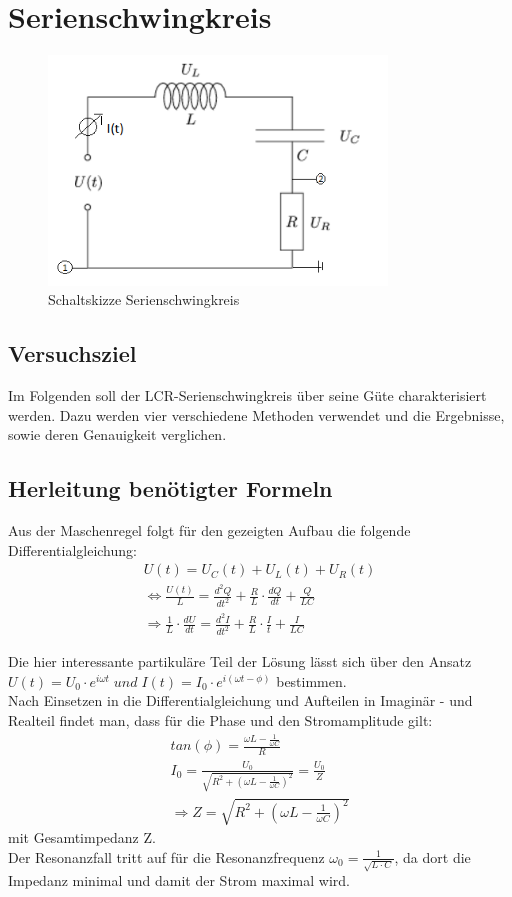 \documentclass[a4paper, 11pt]{article}
\begin{document}
\newpage 
\section{Serienschwingkreis}

\begin{figure}[H]
	\centering
	\includegraphics[trim = 0mm 0mm 0mm 0mm,clip, width=9cm]{Bilder/k.png}%
	\caption[Schaltskizze Serienschwingkreis]{Schaltskizze Serienschwingkreis}%
	\label{pic:Abbildung 1}%
\end{figure}
\subsection{Versuchsziel}
Im Folgenden soll der LCR-Serienschwingkreis über seine Güte charakterisiert werden. Dazu werden vier verschiedene Methoden verwendet und die Ergebnisse, sowie deren Genauigkeit verglichen.

\subsection{Herleitung benötigter Formeln}
Aus der Maschenregel folgt für den gezeigten Aufbau die folgende Differentialgleichung:
\begin{eqnarray}
U(t) = U_C(t) + U_L(t) + U_R(t) \\
\Leftrightarrow \frac{U(t)}{L} = \frac{d^2Q}{dt^2} + \frac{R}{L} \cdot \frac{dQ}{dt} + \frac{Q}{L C} \\
\Rightarrow	\frac{1}{L} \cdot \frac{dU}{dt} = \frac{d^2I}{dt^2} + \frac{R}{L} \cdot\frac{I}{t} + \frac{I}{LC}
\end{eqnarray}

Die hier interessante partikuläre Teil der Lösung lässt sich über den Ansatz $U(t) = U_0 \cdot e^{i \omega t} \; und \; I(t) = I_0 \cdot e^{i( \omega t - \phi)}$ bestimmen.\\
Nach Einsetzen in die Differentialgleichung und Aufteilen in Imaginär - und Realteil findet man, dass für die Phase und den Stromamplitude gilt:
\begin{eqnarray}
tan(\phi) = \frac{\omega L - \frac{1}{\omega C}}{R} \\
I_0 = \frac{U_0}{\sqrt{R^2 + (\omega L - \frac{1}{\omega C})^2}} = \frac{U_0}{Z} \\
\Rightarrow Z = \sqrt{R^2 + (\omega L - \frac{1}{\omega C})^2}
\end{eqnarray}
mit Gesamtimpedanz Z. \\
Der Resonanzfall tritt auf für die Resonanzfrequenz $\omega_0 = \frac{1}{\sqrt{L \cdot C}}$, da dort die Impedanz minimal und damit der Strom maximal wird.
\end{document}
